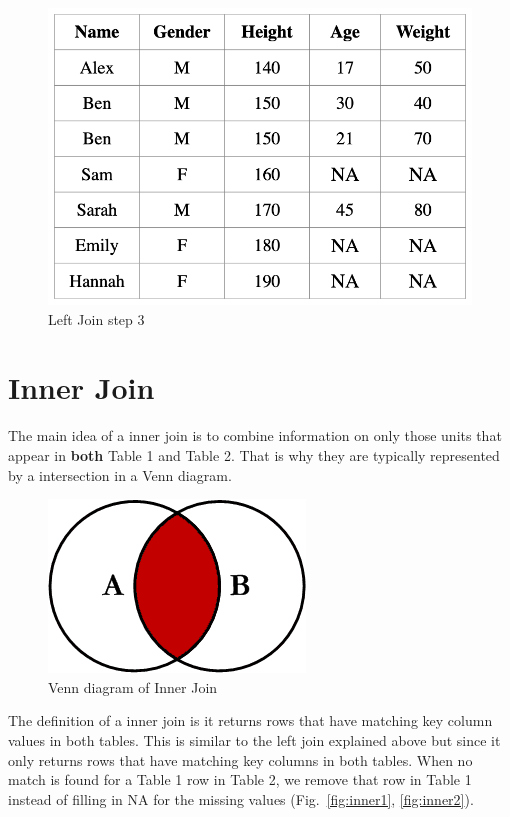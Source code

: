 \begin{figure}[H]
    \centering
    \includegraphics[scale = 0.25]{Masters-Thesis/img/left3.png}
    \caption{Left Join step 3}
    \label{fig:left3}
\end{figure}

\section{Inner Join}
The main idea of a inner join is to combine information on only those units that appear in \textbf{both} Table 1 and Table 2. That is why they are typically represented by a intersection in a Venn diagram. 

\begin{figure}[H]
    \centering
    \includegraphics[scale = 0.5]{Masters-Thesis/img/venninner.png}
    \caption{Venn diagram of Inner Join}
    \label{fig:venninner}
\end{figure}

The definition of a inner join is it returns rows that have matching key column values in both tables. This is similar to the left join explained above but since it only returns rows that have matching key columns in both tables. When no match is found for a Table 1 row in Table 2, we remove that row in Table 1 instead of filling in NA for the missing values (Fig.~\ref{fig:inner1}, \ref{fig:inner2}). 

